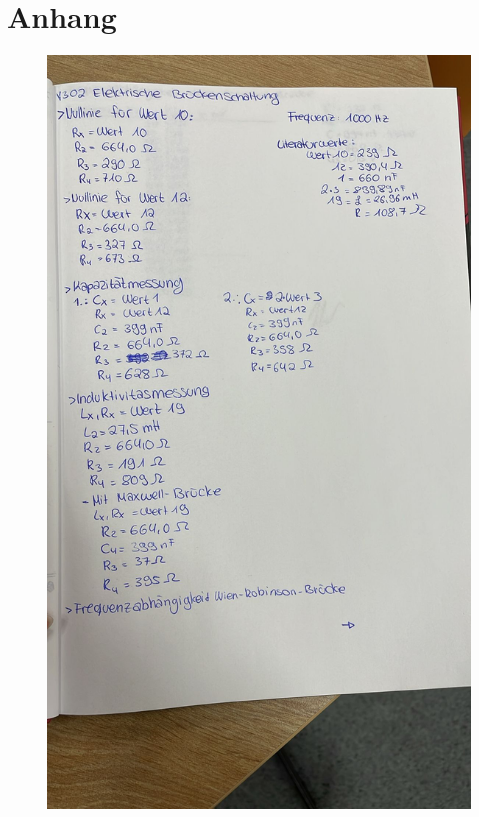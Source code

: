 \section*{Anhang}
\label{sec:Anhang}
\begin{figure}
    \centering
    \includegraphics[width=\textwidth]{Messdaten/Daten2.jpg}
\end{figure}
